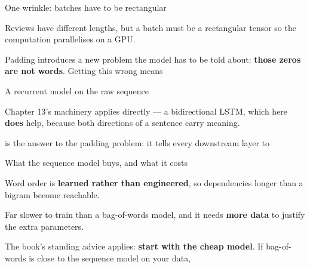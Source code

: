 \documentclass[aspectratio=169,11pt,t]{beamer}
\begin{document}
\begin{frame}[shrink=25]{One wrinkle: batches have to be rectangular}
{\fontsize{9.4}{12.6}\selectfont\color{fg2}Reviews have different lengths, but a batch must be a rectangular tensor so the computation parallelises on a GPU.\par}\vskip 4pt
\begin{iband}[amber]
Padding introduces a new problem the model has to be told about: \textbf{those zeros are not words}. Getting this wrong means 
\end{iband}
\end{frame}

\begin{frame}[shrink=25]{A recurrent model on the raw sequence}
{\fontsize{9.4}{12.6}\selectfont\color{fg2}Chapter 13's machinery applies directly --- a bidirectional LSTM, which here \textbf{does} help, because both directions of a sentence carry meaning.\par}\vskip 4pt
\begin{iband}[signal]
\textbf{} is the answer to the padding problem: it tells every downstream layer to 
\end{iband}
\end{frame}

\begin{frame}[shrink=25]{What the sequence model buys, and what it costs}
\begin{minipage}[t]{0.494\textwidth}
\begin{icardgood}
Word order is \textbf{learned rather than engineered}, so dependencies longer than a bigram become reachable.
\end{icardgood}
\end{minipage}%
\hfill
\begin{minipage}[t]{0.494\textwidth}
\begin{icardwarn}
Far slower to train than a bag-of-words model, and it needs \textbf{more data} to justify the extra parameters.
\end{icardwarn}
\end{minipage}%
\begin{iband}[signal]
The book's standing advice applies: \textbf{start with the cheap model}. If bag-of-words is close to the sequence model on your data, 
\end{iband}
\end{frame}
\end{document}
